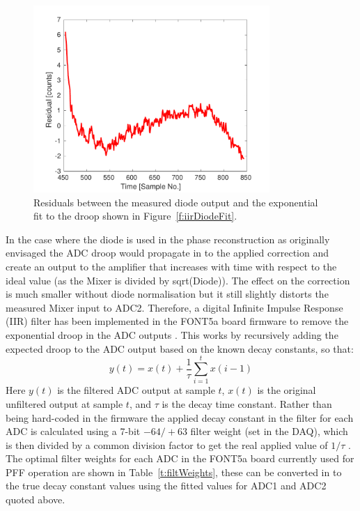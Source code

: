 \begin{figure}
  \centering
  \includegraphics[width=0.8\textwidth]{Figures/commissioning/iirDiodeFitResid}
  \caption{Residuals between the measured diode output and the exponential fit to the droop shown in Figure~\ref{f:iirDiodeFit}.}
  \label{f:iirDiodeFitResid}
\end{figure}

In the case where the diode is used in the phase reconstruction as originally envisaged the ADC droop would propagate in to the applied correction and create an output to the amplifier that increases with time with respect to the ideal value (as the Mixer is divided by sqrt(Diode)). The effect on the correction is much smaller without diode normalisation but it still slightly distorts the measured Mixer input to ADC2. Therefore, a digital Infinite Impulse Response (IIR) filter has been implemented in the FONT5a board firmware to remove the exponential droop in the ADC outputs \cite{glennCLIC14}. This works by recursively adding the expected droop to the ADC output based on the known decay constants, so that:
\begin{equation}
y(t) = x(t) + \frac{1}{\tau} \sum_{i=1}^{t} x(i-1)
\end{equation}
\label{e:iirFilt}
Here \(y(t)\) is the filtered ADC output at sample \(t\), \(x(t)\) is the original unfiltered output at sample \(t\), and \(\tau\) is the decay time constant. Rather than being hard-coded in the firmware the applied decay constant in the filter for each ADC is calculated using a 7-bit \(-64/+63\) filter weight (set in the DAQ), which is then divided by a common division factor to get the real applied value of \(1/\tau\) \cite{glennPriv}. The optimal filter weights for each ADC in the FONT5a board currently used for PFF operation are shown in Table~\ref{t:filtWeights}, these can be converted in to the true decay constant values using the fitted values for ADC1 and ADC2 quoted above.

